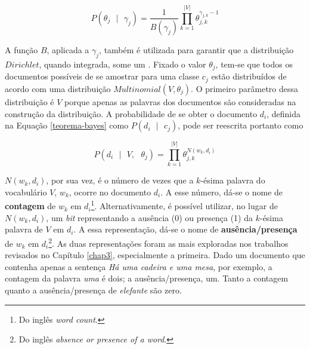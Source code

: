\begin{equation}
\label{dirichlet}
  \ensuremath{P(\theta_j\mbox{ } |\mbox{ } \gamma_j) = \frac{1}{B(\gamma_j)}\prod_{k = 1}^{|V|}\theta_{j,k}^{\gamma_{j,k} - 1}}
\end{equation}

A função \ensuremath{B}, aplicada a \ensuremath{\gamma_j}, também é utilizada para garantir que a distribuição \ensuremath{Dirichlet}, quando integrada, some um \cite{stat-distribs}. Fixado o valor \ensuremath{\theta_j}, tem-se que todos os documentos possíveis de se amostrar para uma classe \ensuremath{c_j} estão distribuídos de acordo com uma distribuição \ensuremath{Multinomial(V, \theta_j)}. O primeiro parâmetro dessa distribuição é \ensuremath{V} porque apenas as palavras dos documentos são consideradas na construção da distribuição. A probabilidade de se obter o documento \ensuremath{d_i}, definida na Equação \ref{teorema-bayes} como \ensuremath{P(d_i\mbox{ }|\mbox{ }c_j)}, pode ser reescrita portanto como %

\begin{equation}
\label{multinomial}
\ensuremath{P(d_i\mbox{ } |\mbox{ } V,\mbox{ } \theta_j)  = \prod_{k = 1}^{|V|}\theta_{j,k}^{N(w_k, d_i)}}
\end{equation}

\ensuremath{N(w_k, d_i)}, por sua vez, é o número de vezes que a \ensuremath{k}-ésima palavra do vocabulário \ensuremath{V}, \ensuremath{w_k}, ocorre no documento \ensuremath{d_i}. A esse número, dá-se o nome de \textbf{contagem} de \ensuremath{w_k} em \ensuremath{d_i}\footnote{Do inglês \emph{word count}.}. Alternativamente, é possível utilizar, no lugar de \ensuremath{N(w_k, d_i)}, um \emph{bit} representando a ausência (0) ou presença (1) da \ensuremath{k}-ésima palavra de \ensuremath{V} em \ensuremath{d_i}. A essa representação, dá-se o nome de \textbf{ausência/presença} de \ensuremath{w_k} em \ensuremath{d_i}\footnote{Do inglês \emph{absence or presence of a word}.}. As duas representações foram as mais exploradas nos trabalhos revisados no Capítulo \ref{chap3}, especialmente a primeira. Dado um documento que contenha apenas a sentença \emph{Há uma cadeira e uma mesa}, por exemplo, a contagem da palavra \emph{uma} é dois; a ausência/presença, um. Tanto a contagem quanto a ausência/presença de \emph{elefante} são zero.


